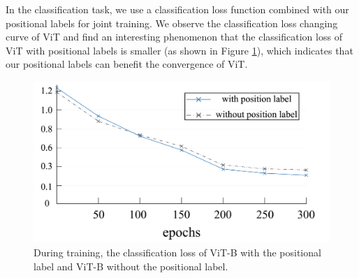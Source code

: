 \documentclass{article}
\begin{document}
In the classification task, we use a classification loss function combined with our positional labels for joint training. We observe the classification loss changing curve of ViT and find an interesting phenomenon that the classification loss of ViT with positional labels is smaller (as shown in Figure \ref{TrainLoss-flabel}), which indicates that our positional labels can benefit the convergence of ViT.

\begin{figure}[h]
  \centering
   \includegraphics[width=0.9\linewidth]{TrainLoss.pdf}
   \caption{During training, the classification loss of ViT-B with the positional label and ViT-B without the positional label.}
   \label{TrainLoss-flabel}
\end{figure}
\end{document}
